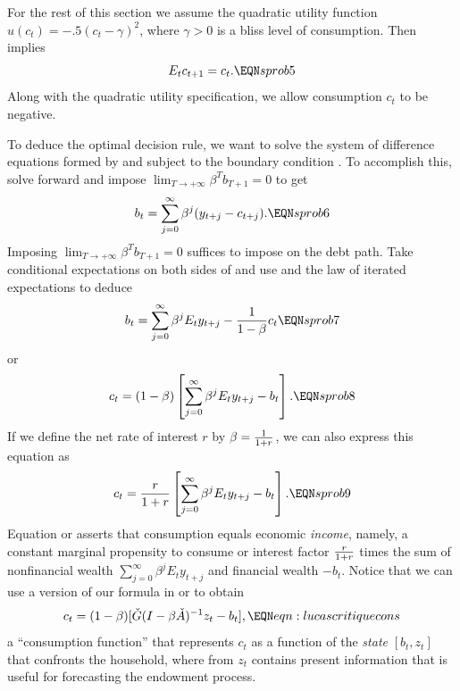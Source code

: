   For the rest of this section we assume
the quadratic  utility function
$u(c_t) =  -.5 (c_t - \gamma)^2$,
where $\gamma >0$ is a bliss level of consumption. Then
 implies
%
$$ E_t c_{t+1} = c_t . \EQN sprob5 $$
Along  with the quadratic utility specification, we allow consumption
$c_t$ to be negative.


 To deduce the optimal decision rule, we want to solve the system
of difference equations formed by  and  
subject to the boundary condition .   To accomplish this,
solve  forward and impose $\lim_{T\rightarrow +\infty} \beta^T b_{T+1} =0$ to get
$$ b_t = \sum_{j=0}^\infty \beta^j (y_{t+j} - c_{t+j}) .  \EQN sprob6 $$
Imposing $\lim_{T\rightarrow +\infty} \beta^T b_{T+1} =0$ suffices to impose  on the debt
path.
Take conditional expectations on both sides of  and use 
and the law of iterated expectations to deduce
$$ b_t = \sum_{j=0}^\infty \beta^j E_t y_{t+j} - {1 \over 1-\beta} c_t
\EQN sprob7 $$
 or
$$ c_t = (1-\beta)
\left[ \sum_{j=0}^\infty \beta^j E_t y_{t+j} - b_t\right].
 \EQN sprob8  $$
If we define the net rate of interest $r$ by $\beta ={1 \over 1+r}$, we can
also express this
equation as
$$ c_t = {r \over 1+r}
\left[ \sum_{j=0}^\infty \beta^j E_t y_{t+j} - b_t\right]. \EQN sprob9 $$
Equation  or  asserts that consumption  equals
economic {\it income\/}, namely,  a constant
marginal propensity to consume or interest factor ${r \over 1+r}$ times
the sum of nonfinancial wealth $
\sum_{j=0}^\infty \beta^j E_t y_{t+j}$ and financial
wealth $-b_t$.   Notice that we can use a version of  our formula  in   or  to obtain
$$  c_t  = (1-\beta) [ \check G(I-\beta \check A)^{-1} z_t - b_t ]  ,  \EQN eqn:lucascritiquecons $$
a ``consumption function'' that   represents
$c_t$  as a function of the {\it state\/} $[b_t, z_t]$ that
 confronts the household, where  from  $z_t$ contains present
information that is useful for forecasting the endowment process.



